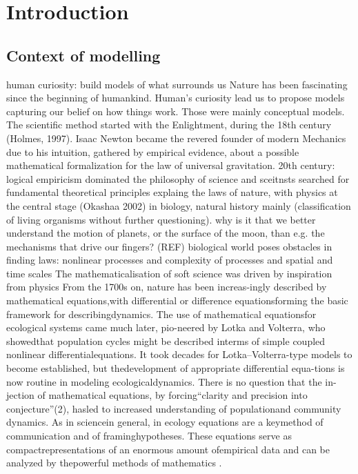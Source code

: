 %
\chapter{Introduction}
\label{sec:intro}


\section{Context of modelling}
\label{sec:intro:context}
\begin{outline}
    \1 human curiosity: build models of what surrounds us
        \2 Nature has been fascinating since the beginning of humankind.
            \3  Human's curiosity lead us to propose models capturing our belief on how things work. Those were mainly conceptual models.
        \2 The scientific method started with the Enlightment, during the 18th century (Holmes, 1997).
            \3 Isaac Newton became the revered founder of modern Mechanics due to his intuition, gathered by empirical evidence, about a possible mathematical formalization for the law of universal gravitation. \cite{Equations2021}
            \3 20th century: logical empiricism dominated the philosophy of science and sceitnsts searched for fundamental theoretical principles explaing the laws of nature, with physics at the central stage (Okashaa 2002)
            \3 in biology, natural history mainly (classification of living organisms without further questioning).
                \4 why is it that we better understand the motion of planets, or the surface of the moon, than e.g. the mechanisms that drive our fingers? (REF)
                \4 biological world poses obstacles in finding laws: nonlinear processes and complexity of processes and spatial and time scales
        \2 The mathematicalisation of soft science was driven by inspiration from physics
            \3 From the 1700s on, nature has been increas-ingly described by mathematical equations,with differential or difference equationsforming the basic framework for describingdynamics. The use of mathematical equationsfor ecological systems came much later, pio-neered by Lotka and Volterra, who showedthat population cycles might be described interms of simple coupled nonlinear differentialequations. It took decades for Lotka–Volterra-type models to become established, but thedevelopment of appropriate differential equa-tions is now routine in modeling ecologicaldynamics. There is no question that the in-jection of mathematical equations, by forcing“clarity and precision into conjecture”(2), hasled to increased understanding of populationand community dynamics. As in sciencein general, in ecology equations are a keymethod of communication and of framinghypotheses. These equations serve as compactrepresentations of an enormous amount ofempirical data and can be analyzed by thepowerful methods of mathematics \cite{DeAngelis2015}.

\end{outline}
